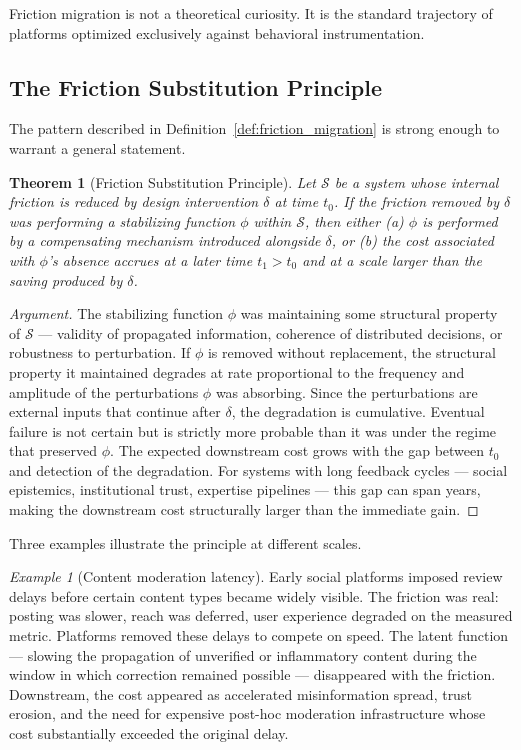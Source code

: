 \documentclass[11pt]{article}
\newtheorem{theorem}{Theorem}
\theoremstyle{remark}
\newtheorem*{example*}{Example}
\begin{document}
Friction migration is not a theoretical curiosity. It is the standard trajectory of platforms optimized exclusively against behavioral instrumentation.

\subsection{The Friction Substitution Principle}

The pattern described in Definition~\ref{def:friction_migration} is strong enough to warrant a general statement.

\begin{theorem}[Friction Substitution Principle]
\label{thm:friction_substitution}
Let $\mathcal{S}$ be a system whose internal friction is reduced by design intervention $\delta$ at time $t_0$. If the friction removed by $\delta$ was performing a stabilizing function $\phi$ within $\mathcal{S}$, then either (a) $\phi$ is performed by a compensating mechanism introduced alongside $\delta$, or (b) the cost associated with $\phi$'s absence accrues at a later time $t_1 > t_0$ and at a scale larger than the saving produced by $\delta$.
\end{theorem}

\begin{proof}[Argument]
The stabilizing function $\phi$ was maintaining some structural property of $\mathcal{S}$ --- validity of propagated information, coherence of distributed decisions, or robustness to perturbation. If $\phi$ is removed without replacement, the structural property it maintained degrades at rate proportional to the frequency and amplitude of the perturbations $\phi$ was absorbing. Since the perturbations are external inputs that continue after $\delta$, the degradation is cumulative. Eventual failure is not certain but is strictly more probable than it was under the regime that preserved $\phi$. The expected downstream cost grows with the gap between $t_0$ and detection of the degradation. For systems with long feedback cycles --- social epistemics, institutional trust, expertise pipelines --- this gap can span years, making the downstream cost structurally larger than the immediate gain.
\end{proof}

Three examples illustrate the principle at different scales.

\begin{example*}[Content moderation latency]
Early social platforms imposed review delays before certain content types became widely visible. The friction was real: posting was slower, reach was deferred, user experience degraded on the measured metric. Platforms removed these delays to compete on speed. The latent function --- slowing the propagation of unverified or inflammatory content during the window in which correction remained possible --- disappeared with the friction. Downstream, the cost appeared as accelerated misinformation spread, trust erosion, and the need for expensive post-hoc moderation infrastructure whose cost substantially exceeded the original delay.
\end{example*}
\end{document}
